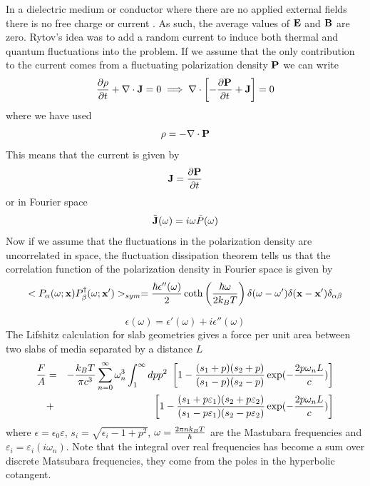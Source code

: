 In a dielectric medium or conductor where there are no applied external fields there is no free charge or current . As such, the average values of ${\bf E}$ and ${\bf B}$ are zero. Rytov's idea was to add a random current to induce both thermal and quantum fluctuations
into the problem. If we assume that the only contribution to the current comes from a fluctuating polarization density ${\bf P}$ we can write
\begin{equation}
{\partial \rho\over \partial t} +\nabla \cdot {\bf J}= 0\implies\nabla\cdot \left[-{\partial {\bf P}\over \partial t} +{\bf J}\right] = 0
\end{equation}
where we have used
\begin{equation}
\rho = -\nabla \cdot {\bf P}
\end{equation}
This means that the current is given by
\begin{equation}
{\bf J}={\partial {\bf P}\over \partial t} 
\end{equation}
or in Fourier space
\begin{equation}
\tilde {\bf J}(\omega)= i\omega \tilde P(\omega)
\end{equation}
Now if we assume that the fluctuations in the polarization density are uncorrelated in space, the fluctuation dissipation theorem tells us that the correlation function of the polarization density in Fourier space is given by
\begin{equation}
< P_\alpha(\omega; {\bf x})P^{\dagger}_\beta(\omega; {\bf x}')>_{sym}=
{\hbar \epsilon''(\omega)\over 2}\coth\left({\hbar\omega\over 2k_B T}\right)\delta(\omega-\omega')\delta({\bf x}-{\bf x}')\delta_{\alpha\beta}
\end{equation}

\begin{equation}
\epsilon(\omega) = \epsilon'(\omega)+i\epsilon''(\omega)
\end{equation}
The Lifshitz calculation for slab geometries gives a force per unit area between two slabs of media separated by a distance $L$
\begin{eqnarray}
{F\over A} &=& -{k_BT \over \pi c^3}\sum_{n=0}^\infty \omega_n^3 \int_1^\infty dp p^2 \ 
\left[ 1-{(s_1+p)(s_2+p)\over (s_1-p)(s_2-p)}\exp(-{2p\omega_n L\over c})\right]\nonumber \\
&+&\left[ 1-{(s_1+p\varepsilon_1)(s_2+p\varepsilon_2)\over (s_1-p\varepsilon_1)(s_2-p\varepsilon_2)}\exp(-{2p\omega_n L\over c})\right]
\end{eqnarray}
where $\epsilon = \epsilon_0\varepsilon$, $s_i = \sqrt{\epsilon_i -1 +p^2}$,
$\omega = {2\pi nk_BT \over \hbar}$ are the Mastubara frequencies \cite{matsubara_new_1955} and ${\varepsilon_i
=\varepsilon_i(i\omega_n)}$. Note that the integral over real frequencies has become a sum over discrete Matsubara frequencies, they come from the poles in the hyperbolic cotangent.

